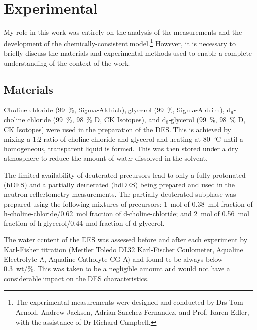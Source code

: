 \section{Experimental}
My role in this work was entirely on the analysis of the measurements and the development of the chemically-consistent model.\footnote{The experimental measurements were designed and conducted by Drs Tom Arnold, Andrew Jackson, Adrian Sanchez-Fernandez, and Prof. Karen Edler, with the assistance of Dr Richard Campbell.}
However, it is necessary to briefly discuss the materials and experimental methods used to enable a complete understanding of the context of the work.

\subsection{Materials}
Choline chloride (\SI{99}{\percent}, Sigma-Aldrich), glycerol (\SI{99}{\percent}, Sigma-Aldrich), d$_{9}$-choline chloride (\SI{99}{\percent}, \SI{98}{\percent} D, CK Isotopes), and d$_{8}$-glycerol (\SI{99}{\percent}, \SI{98}{\percent} D, CK Isotopes) were used in the preparation of the DES.
This is achieved by mixing a $1$:$2$ ratio of choline-chloride and glycerol and heating at \SI{80}{\celsius} until a homogeneous, transparent liquid is formed.\autocite{smith_deep_2014}
This was then stored under a dry atmosphere to reduce the amount of water dissolved in the solvent.

The limited availability of deuterated precursors lead to only a fully protonated (hDES) and a partially deuterated (hdDES) being prepared and used in the neutron reflectometry measurements.
The partially deuterated subphase was prepared using the following mixtures of precursors: \SI{1}{\mole} of \SI{0.38}{\mole} fraction of h-choline-chloride/\SI{0.62}{\mole} fraction of d-choline-chloride; and \SI{2}{\mole} of \SI{0.56}{\mole} fraction of h-glycerol/\SI{0.44}{\mole} fraction of d-glycerol.

The water content of the DES was assessed before and after each experiment by Karl-Fisher titration (Mettler Toledo DL32 Karl-Fischer Coulometer, Aqualine Electrolyte A, Aqualine Catholyte CG A) and found to be always below \SI{0.3}{wt/\percent}.
This was taken to be a negligible amount and would not have a considerable impact on the DES characteristics.\autocite{hammond_liquid_2016,hammond_resilience_2017}

